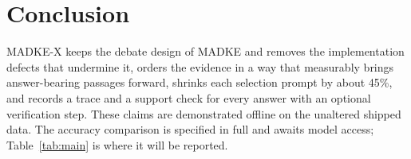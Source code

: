 \section{Conclusion}
\label{sec:conclusion}

MADKE-X keeps the debate design of MADKE and removes the implementation defects that undermine it, orders the evidence in a way that measurably brings answer-bearing passages forward, shrinks each selection prompt by about 45\%, and records a trace and a support check for every answer with an optional verification step. These claims are demonstrated offline on the unaltered shipped data. The accuracy comparison is specified in full and awaits model access; Table~\ref{tab:main} is where it will be reported.

